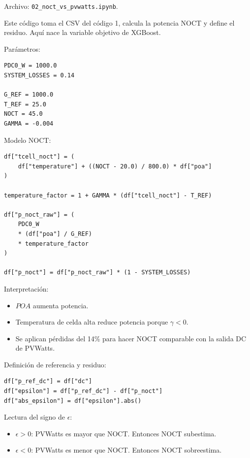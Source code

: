 \documentclass[11pt, letterpaper]{article}
\begin{document}
Archivo: \texttt{02\_noct\_vs\_pvwatts.ipynb}.

Este c\'odigo toma el CSV del c\'odigo 1, calcula la potencia NOCT y define el residuo. Aqu\'i nace la variable objetivo de XGBoost.

Par\'ametros:

\begin{lstlisting}[style=pythonstyle]
PDC0_W = 1000.0
SYSTEM_LOSSES = 0.14

G_REF = 1000.0
T_REF = 25.0
NOCT = 45.0
GAMMA = -0.004
\end{lstlisting}

Modelo NOCT:

\begin{lstlisting}[style=pythonstyle]
df["tcell_noct"] = (
    df["temperature"] + ((NOCT - 20.0) / 800.0) * df["poa"]
)

temperature_factor = 1 + GAMMA * (df["tcell_noct"] - T_REF)

df["p_noct_raw"] = (
    PDC0_W
    * (df["poa"] / G_REF)
    * temperature_factor
)

df["p_noct"] = df["p_noct_raw"] * (1 - SYSTEM_LOSSES)
\end{lstlisting}

Interpretaci\'on:

\begin{itemize}
    \item \(POA\) aumenta potencia.
    \item Temperatura de celda alta reduce potencia porque \(\gamma<0\).
    \item Se aplican p\'erdidas del 14\% para hacer NOCT comparable con la salida DC de PVWatts.
\end{itemize}

Definici\'on de referencia y residuo:

\begin{lstlisting}[style=pythonstyle]
df["p_ref_dc"] = df["dc"]
df["epsilon"] = df["p_ref_dc"] - df["p_noct"]
df["abs_epsilon"] = df["epsilon"].abs()
\end{lstlisting}

Lectura del signo de \(\epsilon\):

\begin{itemize}
    \item \(\epsilon>0\): PVWatts es mayor que NOCT. Entonces NOCT subestima.
    \item \(\epsilon<0\): PVWatts es menor que NOCT. Entonces NOCT sobreestima.
\end{itemize}
\end{document}
